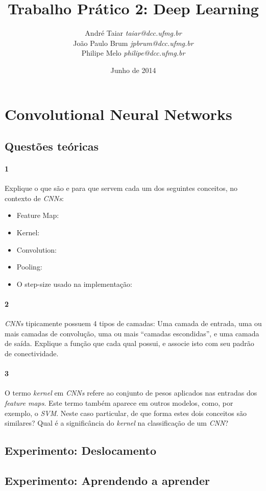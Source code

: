 \documentclass[12pt, a4paper, brazil, portuguese]{article}
\title{Trabalho Prático 2: Deep Learning}
\date{Junho de 2014}
\author{
    André Taiar      \emph{taiar@dcc.ufmg.br}   \\
    João Paulo Brum  \emph{jpbrum@dcc.ufmg.br}  \\
    Philipe Melo     \emph{philipe@dcc.ufmg.br}
  }
\begin{document}
\maketitle

\section{Convolutional Neural Networks}
\subsection{Questões teóricas}
\paragraph{1} Explique o que são e para que servem cada um dos seguintes conceitos, no contexto de
  \emph{CNNs}:
\begin{itemize}
  \item Feature Map:
  \item Kernel:
  \item Convolution:
  \item Pooling:
  \item O step-size usado na implementação:
\end{itemize}

\paragraph{2} \emph{CNNs} tipicamente possuem 4 tipos de camadas: Uma camada de entrada, uma ou mais
  camadas de convolução, uma ou mais ``camadas escondidas'', e uma camada de saída. Explique a
  função que cada qual possui, e associe isto com seu padrão de conectividade.

\paragraph{3} O termo \emph{kernel} em \emph{CNNs} refere ao conjunto de pesos aplicados nas
  entradas dos \emph{feature maps}. Este termo também aparece em outros modelos, como, por exemplo,
  o \emph{SVM}. Neste caso particular, de que forma estes dois conceitos são similares? Qual é a
  significância do \emph{kernel} na classificação de um \emph{CNN}?

\subsection{Experimento: Deslocamento }
\subsection{Experimento: Aprendendo a aprender}
\end{document}
